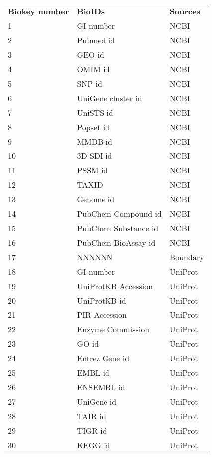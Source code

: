 \documentclass[a4paper]{article}
\begin{document}
\begin{center}
\begin{tabular}{ l l l}
\textbf{Biokey number}	& \textbf{BioIDs} &	\textbf{Sources} \\ 
1	& GI number	& NCBI \\
2	& Pubmed id &	NCBI \\
3	& GEO id & NCBI      \\
4	& OMIM id	& NCBI       \\
5	& SNP id	& NCBI       \\
6	& UniGene cluster id	& NCBI \\
7	& UniSTS id	& NCBI          \\
8	& Popset id	& NCBI           \\
9	& MMDB id	& NCBI              \\
10	& 3D SDI id &	NCBI          \\
11	& PSSM id	& NCBI            \\
12	& TAXID	& NCBI               \\
13	& Genome id	& NCBI            \\
14	& PubChem Compound id	& NCBI   \\
15	& PubChem Substance id	& NCBI  \\
16	& PubChem BioAssay id	& NCBI     \\
17	& NNNNNN	& Boundary              \\
18	& GI number	& UniProt             \\
19	& UniProtKB Accession	& UniProt   \\
20	& UniProtKB id	& UniProt        \\
21	& PIR Accession	& UniProt        \\
22	& Enzyme Commission	& UniProt    \\
23	& GO id	& UniProt                \\
24	& Entrez Gene id &	UniProt      \\
25	& EMBL id	& UniProt               \\
26	& ENSEMBL id	& UniProt          \\
27	& UniGene id	& UniProt          \\
28	& TAIR id	& UniProt              \\
29	& TIGR id	& UniProt              \\
30	& KEGG id	& UniProt              \\
\end{tabular}
\newpage
\begin{tabular}{ l l l}

\end{tabular}
\end{center}
\end{document}
